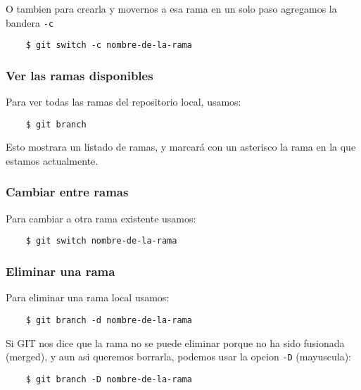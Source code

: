             O tambien para crearla y movernos a esa rama en un solo paso agregamos la bandera \texttt{-c}
            \begin{lstlisting}
    $ git switch -c nombre-de-la-rama
            \end{lstlisting}

        \subsubsection{Ver las ramas disponibles}
            Para ver todas las ramas del repositorio local, usamos:
            \begin{lstlisting}
    $ git branch
            \end{lstlisting}

            Esto mostrara un listado de ramas, y marcar\'a con un asterisco la rama en la que estamos actualmente.

        \subsubsection{Cambiar entre ramas}
            Para cambiar a otra rama existente usamos:
            \begin{lstlisting}
    $ git switch nombre-de-la-rama
            \end{lstlisting}
            
        \subsubsection{Eliminar una rama}
            Para eliminar una rama local usamos:
            \begin{lstlisting}
    $ git branch -d nombre-de-la-rama
            \end{lstlisting}

            Si GIT nos dice que la rama no se puede eliminar porque no ha sido fusionada (merged), y aun asi queremos borrarla, podemos usar la opcion \texttt{-D} (mayuscula):
            \begin{lstlisting}
    $ git branch -D nombre-de-la-rama
            \end{lstlisting}